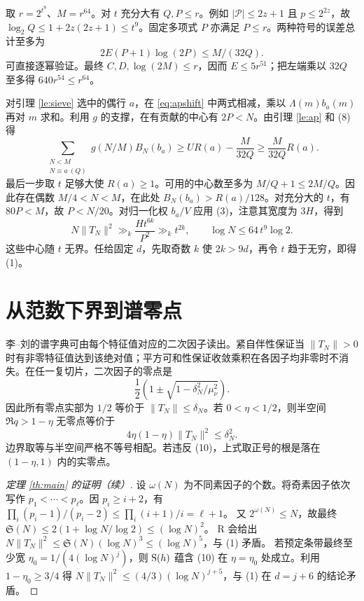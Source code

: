 \documentclass[UTF8,a4paper,11pt,fontset=fandol]{ctexart}
\newcommand{\Sg}{\mathfrak S}
\newcommand{\Lam}{\Lambda}
\begin{document}
取 \(r=2^{t^9}\)、\(M=r^{64}\)。对 \(t\) 充分大有 \(Q,P\le r\)。例如 \(|\mathcal P|\le 2z+1\) 且 \(p\le 2^{2z}\)，故 \(\log_2 Q\le1+2z(2z+1)\le t^9\)。固定多项式 \(P\) 亦满足 \(P\le r\)。两种符号的误差总计至多为
\[
            2E(P+1)\log(2P)\le M/(32Q).                      \tag{8}
\]
可直接逐幂验证。最终 \(C,D,\log(2M)\le r\)，因而 \(E\le5r^{51}\)；把左端乘以 \(32Q\) 至多得 \(640r^{54}\le r^{64}\)。

对引理 \ref{le:sieve} 选中的偶行 \(a\)，在 \eqref{eq:apshift} 中两式相减，乘以 \(\Lam(m)b_a(m)\) 再对 \(m\) 求和。利用 \(g\) 的支撑，在有贡献的中心有 \(2P<N\)。由引理 \ref{le:ap} 和 (8) 得
\[
 \sum_{\substack{N<M\\N\equiv a\ (Q)}}g(N/M)B_N(b_a)
     \ge U R(a)-\frac{M}{32Q}
     \ge\frac{M}{32Q}R(a) .
\]
最后一步取 \(t\) 足够大使 \(R(a)\ge1\)。可用的中心数至多为 \(M/Q+1\le2M/Q\)。因此存在偶数 \(M/4<N<M\)，在此处
\(B_N(b_a)>R(a)/128\)。对充分大的 \(t\)，有 \(80P<M\)，故 \(P<N/20\)。对归一化权 \(b_a/V\) 应用 (3)，注意其宽度为 \(3H\)，得到
\[
               N\|T_N\|^2\gg_k \frac{H t^{6k}}{P^2}
                     \gg_k t^{2k},\qquad
               \log N\le 64\,t^9\log 2 .                       \tag{9}
\]
这些中心随 \(t\) 无界。任给固定 \(d\)，先取奇数 \(k\) 使 \(2k>9d\)，再令 \(t\) 趋于无穷，即得 (1)。

\section{从范数下界到谱零点}
李--刘的谱字典可由每个特征值对应的二次因子读出。紧自伴性保证当 \(\|T_N\|>0\) 时有非零特征值达到该绝对值；平方可和性保证收敛乘积在各因子均非零时不消失。在任一复切片，二次因子的零点是
\[
          \frac{1}{2}\left(1\pm\sqrt{1-\delta_N^2/\mu_\nu^2}\right).
\]
因此所有零点实部为 \(1/2\) 等价于 \(\|T_N\|\le\delta_N\)。若 \(0<\eta<1/2\)，则半空间 \(\Re q>1-\eta\) 无零点等价于
\[
                4\eta(1-\eta)\|T_N\|^2\le\delta_N^2 .          \tag{10}
\]
边界取等与半空间严格不等号相配。若违反 (10)，上式取正号的根是落在 \((1-\eta,1)\) 内的实零点。

\begin{proof}[定理 \ref{th:main} 的证明（续）]
设 \(\omega(N)\) 为不同素因子的个数。将奇素因子依次写作 \(p_1<\cdots<p_\ell\)。因 \(p_i\ge i+2\)，有
\(\prod_i(p_i-1)/(p_i-2)\le\prod_i(i+1)/i=\ell+1\)。
又 \(2^{\omega(N)}\le N\)，故最终
\(\Sg(N)\le 2(1+\log N/\log 2)\le(\log N)^2\)。
R 会给出 \(N\|T_N\|^2\le\Sg(N)(\log N)^3\le(\log N)^5\)，与 (1) 矛盾。
若预定条带最终至少宽 \(\eta_0=1/(4(\log N)^j)\)，则 \({\rm S}(h)\) 蕴含 (10) 在 \(\eta=\eta_0\) 处成立。利用 \(1-\eta_0\ge 3/4\) 得
\(N\|T_N\|^2\le (4/3)(\log N)^{j+5}\)，与 (1) 在 \(d=j+6\) 的结论矛盾。
\end{proof}
\end{document}

